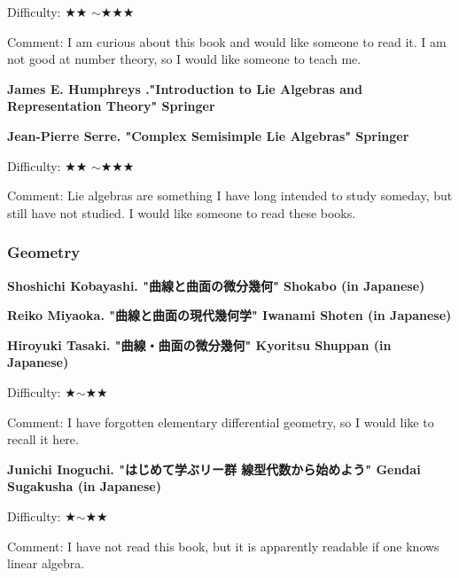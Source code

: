 Difficulty: ★★ $\sim$★★★\vspace{-6pt} 

Comment: I am curious about this book and would like someone to read it. I am not good at number theory, so I would like someone to teach me.
\vspace{8pt}


\textbf{James E. Humphreys ."Introduction to Lie Algebras and Representation Theory" Springer} \vspace{-6pt} 

\textbf{Jean-Pierre Serre. "Complex Semisimple Lie Algebras" Springer}  　\vspace{-6pt} 

Difficulty: ★★ $\sim$★★★\vspace{-6pt} 

Comment: Lie algebras are something I have long intended to study someday, but still have not studied. I would like someone to read these books. 

\vspace{8pt}

\subsubsection{Geometry}

\textbf{Shoshichi Kobayashi. "曲線と曲面の微分幾何" Shokabo (in Japanese)}  　\vspace{-6pt} 

\textbf{Reiko Miyaoka. "曲線と曲面の現代幾何学" Iwanami Shoten (in Japanese)}  　\vspace{-6pt} 

\textbf{Hiroyuki Tasaki. "曲線・曲面の微分幾何" Kyoritsu Shuppan (in Japanese)}  　\vspace{-6pt} 

Difficulty: ★$\sim$★★ 　\vspace{-6pt} 

Comment: I have forgotten elementary differential geometry, so I would like to recall it here.

\vspace{8pt}

\textbf{Junichi Inoguchi. "はじめて学ぶリー群 線型代数から始めよう" Gendai Sugakusha (in Japanese)}  　\vspace{-6pt} 

Difficulty: ★$\sim$★★ 　\vspace{-6pt} 

Comment: I have not read this book, but it is apparently readable if one knows linear algebra. \vspace{8pt}

